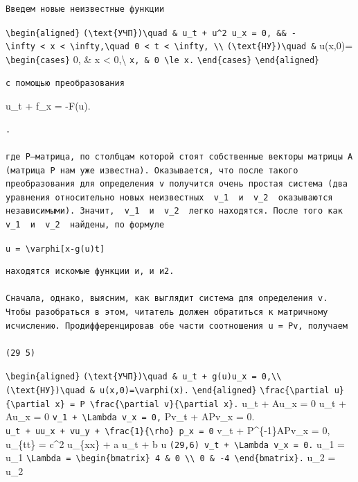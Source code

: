 \documentclass[
  ukrainian,
]{article}
\begin{document}
\begin{verbatim}
Введем новые неизвестные функции
\end{verbatim}

\texttt{\textbackslash{}begin\{aligned\}}
\texttt{(\textbackslash{}text\{УЧП\})\textbackslash{}quad\ \&\ u\_t\ +\ u\^{}2\ u\_x\ =\ 0,\ \&\&\ -\textbackslash{}infty\ \textless{}\ x\ \textless{}\ \textbackslash{}infty,\textbackslash{}quad\ 0\ \textless{}\ t\ \textless{}\ \textbackslash{}infty,\ \textbackslash{}\textbackslash{}}
\texttt{(\textbackslash{}text\{НУ\})\textbackslash{}quad\ \&} u(x,0)=
\texttt{\textbackslash{}begin\{cases\}} 0, \& x \textless{}
0,\textbackslash{} \texttt{x,\ \&\ 0\ \textbackslash{}le\ x.}
\texttt{\textbackslash{}end\{cases\}}
\texttt{\textbackslash{}end\{aligned\}}

\begin{verbatim}
с помощью преобразования
\end{verbatim}

u\_t + f\_x = -F(u).

\begin{verbatim}
.

где P—матрица, по столбцам которой стоят собственные векторы матрицы A (матрица P нам уже известна). Оказывается, что после такого преобразования для определения v получится очень простая система (два уравнения относительно новых неизвестных  v_1  и  v_2  оказываются независимыми). Значит,  v_1  и  v_2  легко находятся. После того как  v_1  и  v_2  найдены, по формуле
\end{verbatim}

\texttt{u\ =\ \textbackslash{}varphi{[}x-g(u)t{]}}

\begin{verbatim}
находятся искомые функции и, и и2.

Сначала, однако, выясним, как выглядит система для определения v. Чтобы разобраться в этом, читатель должен обратиться к матричному исчислению. Продифференцировав обе части соотношения u = Pv, получаем

(29 5)
\end{verbatim}

\texttt{\textbackslash{}begin\{aligned\}}
\texttt{(\textbackslash{}text\{УЧП\})\textbackslash{}quad\ \&\ u\_t\ +\ g(u)u\_x\ =\ 0,\textbackslash{}\textbackslash{}}
\texttt{(\textbackslash{}text\{НУ\})\textbackslash{}quad\ \&\ u(x,0)=\textbackslash{}varphi(x).}
\texttt{\textbackslash{}end\{aligned\}}
\texttt{\textbackslash{}frac\{\textbackslash{}partial\ u\}\{\textbackslash{}partial\ x\}\ =\ P\ \textbackslash{}frac\{\textbackslash{}partial\ v\}\{\textbackslash{}partial\ x\}.}
u\_t + Au\_x = 0 u\_t + Au\_x = 0
\texttt{v\_1\ +\ \textbackslash{}Lambda\ v\_x\ =\ 0,} Pv\_t + APv\_x =
0.
\texttt{u\_t\ +\ uu\_x\ +\ vu\_y\ +\ \textbackslash{}frac\{1\}\{\textbackslash{}rho\}\ p\_x\ =\ 0}
v\_t + P\^{}\{-1\}APv\_x = 0, u\_\{tt\} = c\^{}2 u\_\{xx\} + a u\_t + b
u \texttt{(29,6)\ v\_t\ +\ \textbackslash{}Lambda\ v\_x\ =\ 0.} u\_1 =
u\_1
\texttt{\textbackslash{}Lambda\ =\ \textbackslash{}begin\{bmatrix\}\ 4\ \&\ 0\ \textbackslash{}\textbackslash{}\ 0\ \&\ -4\ \textbackslash{}end\{bmatrix\}.}
u\_2 = u\_2
\end{document}
